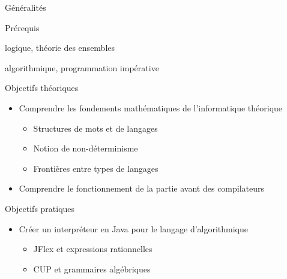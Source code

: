 
\begingroup

\begin{frame}{Généralités}
  
  \vspace{-1mm}
  \begin{block}{Prérequis}
    \begin{description}[Mathématiques :]
    \item[Mathématiques :]\vspace{-1mm} logique, théorie des ensembles
    \item[Informatique :] algorithmique, programmation impérative 
    \end{description}
  \end{block}

  \vspace{-1mm}
  \begin{block}{Objectifs théoriques}
    \begin{itemize}
    \item Comprendre les fondements mathématiques de l'informatique théorique
      \begin{itemize}
      \item Structures de mots et de langages
      \item Notion de non-déterminisme
      \item Frontières entre types de langages
      \end{itemize}
    \item Comprendre le fonctionnement de la partie avant des compilateurs
    \end{itemize}
  \end{block}

  \vspace{-1mm}
  \begin{block}{Objectifs pratiques}
    \begin{itemize}
    \item Créer un interpréteur en Java pour le langage d'algorithmique 
      \begin{itemize}
      \item JFlex et expressions rationnelles
      \item CUP et grammaires algébriques
      \end{itemize}
    \end{itemize}
  \end{block}

\end{frame}

\endgroup
